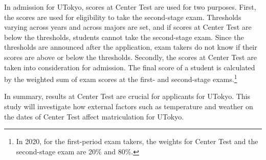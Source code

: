 \documentclass[12pt,letterpaper]{article}
\begin{document}

In admission for UTokyo, scores at Center Test are used for two purposes.
First, the scores are used for eligibility to take the second-stage exam.
Thresholds varying across years and across majors are set, and if scores at Center Test are below the thresholds, students cannot take the second-stage exam.
Since the thresholds are announced after the application, exam takers do not know if their scores are above or below the thresholds.
Secondly, the scores at Center Test are taken into consideration for admission.
The final score of a student is calculated by the weighted sum of exam scores at the first- and second-stage exams.\footnote{
  In 2020, for the first-period exam takers, the weights for Center Test and the second-stage exam are 20\% and 80\%.
}

In summary, results at Center Test are crucial for applicants for UTokyo.
This study will investigate how external factors such as temperature and weather on the dates of Center Test affect matriculation for UTokyo.
\end{document}
